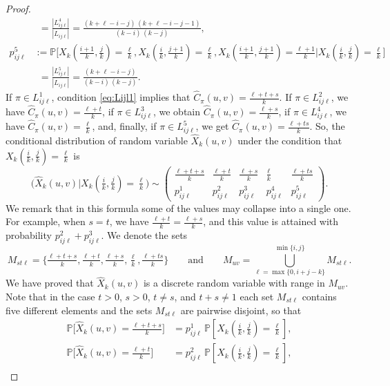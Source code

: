 \documentclass[10pt,a4paper]{amsart}
\newcommand{\Chat}{\widehat{C}}
\newcommand{\PP}{\mathbb{P}}
\newcommand{\Xhat}{\widehat{X}}
\begin{document}
\begin{proof}
\begin{align*}
   & \phantom{:}= \frac{|L_{ij\ell}^4|}{|L_{ij\ell}|} = \frac{(k+\ell-i-j) \, (k+\ell-i-j-1)}{(k-i) \, (k-j)} , \\
   p_{ij\ell}^5 &:=\PP\big[X_k(\tfrac{i+1}{k},\tfrac{j}{k}) = \tfrac{\ell}{k},  X_k(\tfrac{i}{k},\tfrac{j+1}{k}) = \tfrac{\ell}{k},  X_k(\tfrac{i+1}{k},\tfrac{j+1}{k}) = \tfrac{\ell+1}{k} \big| X_k(\tfrac{i}{k},\tfrac{j}{k}) = \tfrac{\ell}{k}\big] \\
   & \phantom{:}= \frac{|L_{ij\ell}^5|}{|L_{ij\ell}|} = \frac{(k+\ell-i-j)}{(k-i) \, (k-j)} .
\end{align*}
If $\pi \in L_{ij\ell}^1$, condition \eqref{eq:Lijl1} implies that $\Chat_\pi(u,v) =  \frac{\ell+t+s}{k}$. If $\pi \in L_{ij\ell}^2$, we have $\Chat_\pi(u,v) =  \frac{\ell+t}{k}$, if $\pi \in L_{ij\ell}^3$, we obtain $\Chat_\pi(u,v) =  \frac{\ell+s}{k}$, if $\pi \in L_{ij\ell}^4$, we have $\Chat_\pi(u,v) =  \frac{\ell}{k}$, and, finally, if $\pi \in L_{ij\ell}^5$, we get $\Chat_\pi(u,v) =  \frac{\ell+ts}{k}$.
So, the conditional distribution of random variable $\Xhat_k(u,v)$ under the condition that $X_k(\tfrac{i}{k},\tfrac{j}{k}) = \tfrac{\ell}{k}$ is
$$\big(\Xhat_k(u,v) \big| X_k(\tfrac{i}{k},\tfrac{j}{k}) = \tfrac{\ell}{k}\big) \sim  \begin{pmatrix}
    \frac{\ell+t+s}{k} & \frac{\ell+t}{k} & \frac{\ell+s}{k} & \frac{\ell}{k} & \frac{\ell+ts}{k} \\[2mm]
    p_{ij\ell}^1 & p_{ij\ell}^2 & p_{ij\ell}^3 & p_{ij\ell}^4 & p_{ij\ell}^5
\end{pmatrix}.$$
We remark that in this formula some of the values may collapse into a single one. For example, when $s=t$, we have $\frac{\ell+t}{k}=\frac{\ell+s}{k}$, and this value is attained with probability $p_{ij\ell}^2+p_{ij\ell}^3$.
We denote the sets
$$M_{st\ell} = \{\tfrac{\ell+t+s}{k}, \tfrac{\ell+t}{k}, \tfrac{\ell+s}{k}, \tfrac{\ell}{k}, \tfrac{\ell+ts}{k}\} \qquad \text{and} \qquad M_{uv} = \bigcup_{\ell=\max \{0,  i+j-k \}}^{\min \{i,j \}} M_{st\ell}.$$
We have proved that $\Xhat_k(u,v)$ is a discrete random variable with range in $M_{uv}$. Note that in the case $t > 0$, $s > 0$, $t\ne s$, and $t+s \ne 1$ each set $M_{st\ell}$ contains five different elements and the sets $M_{st\ell}$ are pairwise disjoint, so that 
\begin{align*}
    \PP\big[\Xhat_k(u,v) = \tfrac{\ell+t+s}{k}\big] &= p_{ij\ell}^1\, \PP[X_k(\tfrac{i}{k},\tfrac{j}{k}) = \tfrac{\ell}{k}], \\
    \PP\big[\Xhat_k(u,v) = \tfrac{\ell+t}{k}\big] &= p_{ij\ell}^2\, \PP[X_k(\tfrac{i}{k},\tfrac{j}{k}) = \tfrac{\ell}{k}], \\

\end{align*}
\end{proof}
\end{document}
